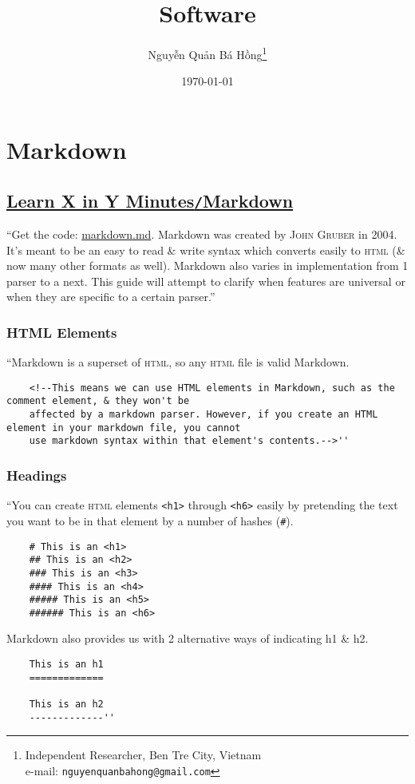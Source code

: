 \documentclass[oneside]{book}
\title{Software}
\author{\selectlanguage{vietnamese} Nguyễn Quản Bá Hồng\footnote{Independent Researcher, Ben Tre City, Vietnam\\e-mail: \texttt{nguyenquanbahong@gmail.com}}}
\date{\today}
\numberwithin{equation}{section}
\begin{document}
\maketitle
{}
\tableofcontents


\chapter{Markdown}

\section{\href{https://learnxinyminutes.com/docs/markdown/}{Learn X in Y Minutes\texttt{/}Markdown}}
``Get the code: \href{https://learnxinyminutes.com/docs/files/markdown.md}{markdown.md}. Markdown was created by \textsc{John Gruber} in 2004. It's meant to be an easy to read \& write syntax which converts easily to \textsc{html} (\& now many other formats as well). Markdown also varies in implementation from 1 parser to a next. This guide will attempt to clarify when features are universal or when they are specific to a certain parser.''

\subsection{HTML Elements}
``Markdown is a superset of \textsc{html}, so any \textsc{html} file is valid Markdown.
\begin{verbatim}
	<!--This means we can use HTML elements in Markdown, such as the comment element, & they won't be
	affected by a markdown parser. However, if you create an HTML element in your markdown file, you cannot
	use markdown syntax within that element's contents.-->''
\end{verbatim}

\subsection{Headings}
``You can create \textsc{html} elements \texttt{<h1>} through \texttt{<h6>} easily by pretending the text you want to be in that element by a number of hashes (\verb|#|).
\begin{verbatim}
	# This is an <h1>
	## This is an <h2>
	### This is an <h3>
	#### This is an <h4>
	##### This is an <h5>
	###### This is an <h6>
\end{verbatim}
Markdown also provides us with 2 alternative ways of indicating h1 \& h2.
\begin{verbatim}
	This is an h1
	=============
	
	This is an h2
	-------------''
\end{verbatim}
\end{document}

